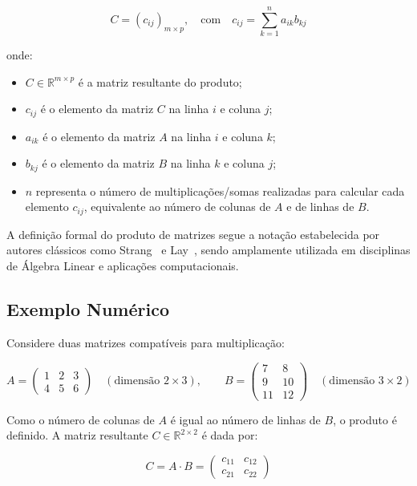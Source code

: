 \begin{equation}
	C = \left( c_{ij} \right)_{m \times p}, \quad \text{com} \quad c_{ij} = \sum_{k=1}^{n} a_{ik} b_{kj}
	\label{eq:produto_escalar}
\end{equation}

onde:
\begin{itemize}
	\item \( C \in \mathbb{R}^{m \times p} \) é a matriz resultante do produto;
	\item \( c_{ij} \) é o elemento da matriz \( C \) na linha \( i \) e coluna \( j \);
	\item \( a_{ik} \) é o elemento da matriz \( A \) na linha \( i \) e coluna \( k \);
	\item \( b_{kj} \) é o elemento da matriz \( B \) na linha \( k \) e coluna \( j \);
	\item \( n \) representa o número de multiplicações/somas realizadas para calcular cada elemento \( c_{ij} \), equivalente ao número de colunas de \( A \) e de linhas de \( B \).
\end{itemize}

A definição formal do produto de matrizes segue a notação estabelecida por autores clássicos como Strang~\cite{strang2022introduction} e Lay~\cite{lay2003linear}, sendo amplamente utilizada em disciplinas de Álgebra Linear e aplicações computacionais.

\subsection{Exemplo Numérico}

Considere duas matrizes compatíveis para multiplicação:

\[
	A = \begin{pmatrix}
		1 & 2 & 3 \\
		4 & 5 & 6
	\end{pmatrix}
	\quad (\text{dimensão } 2 \times 3), \qquad
	B = \begin{pmatrix}
		7  & 8  \\
		9  & 10 \\
		11 & 12
	\end{pmatrix}
	\quad (\text{dimensão } 3 \times 2)
\]

Como o número de colunas de \( A \) é igual ao número de linhas de \( B \), o produto é definido. A matriz resultante \( C \in \mathbb{R}^{2 \times 2} \) é dada por:

\[
	C = A \cdot B =
	\begin{pmatrix}
		c_{11} & c_{12} \\
		c_{21} & c_{22}
	\end{pmatrix}
\]

